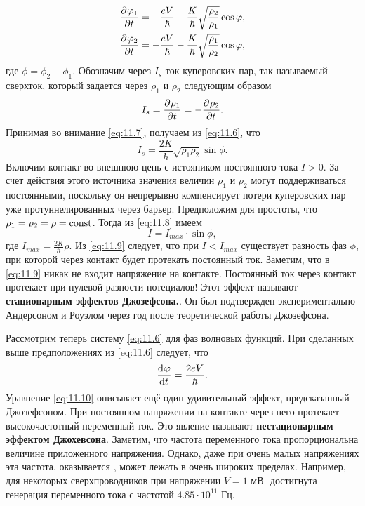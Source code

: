 \begin{align}
        \label{eq:11.6}
        \pdv[]{\varphi_{1}}{t} = -\frac{eV}{\hbar} - \frac{K}{\hbar}\sqrt{\frac{\rho_{2}}{\rho_{1}}}
        \cos \varphi, \\
        \pdv[]{\varphi_{2}}{t} = -\frac{eV}{\hbar} - \frac{K}{\hbar}\sqrt{\frac{\rho_{1}}{\rho_{2}}}
        \cos \varphi, \\
\end{align}
где $\phi = \phi_{2}-\phi_{1}$. Обозначим через $I_s$ ток куперовских пар, так называемый
сверхток, который задается через $\rho_{1}$ и $\rho_{2}$ следующим образом
\begin{equation}
        \label{eq:11.7}
        I_s = \pdv[]{\rho_{1}}{t}= - \pdv[]{\rho_{2}}{t}.
\end{equation}
Принимая во внимание \eqref{eq:11.7}, получаем из \eqref{eq:11.6}, что
\begin{equation}
        \label{eq:11.8}
        I_s = \frac{2K}{\hbar}\sqrt{\rho_{1}\rho_{2}} \sin \phi.
\end{equation}
Включим контакт во внешнюю цепь с истояником постоянного тока $I>0$. За счет действия этого источника
значения величин $\rho_{1}$ и $\rho_{2}$ могут поддерживаться постоянными, поскольку он непрерывно компенсирует потери куперовских пар уже протуннелированных через барьер. Предположим для простоты,
что $\rho_{1}= \rho_{2}=\rho= \textrm{const}$. Тогда из \eqref{eq:11.8} имеем
\begin{equation}
        \label{eq:11.9}
        I= I_{max}\cdot \sin\phi,
\end{equation}
где $I_{max} = \frac{2K}{\hbar}\rho$. Из \eqref{eq:11.9} следует, что при $I<I_{max}$ существует
разность фаз $\phi$, при которой через контакт будет протекать постоянный ток. 
Заметим, что в \eqref{eq:11.9} никак не входит напряжение на контакте. Постоянный ток через контакт протекает при нулевой разности потециалов!
Этот эффект называют \textbf{стационарным эффектов Джозефсона.}. Он был подтвержден экспериментально
Андерсоном и Роуэлом через год после теоретической работы Джозефсона.

Рассмотрим теперь систему \eqref{eq:11.6} для фаз волновых функций. При сделанных выше предположениях
из \eqref{eq:11.6} следует, что
\begin{equation}
        \label{eq:11.10}
        \dv[]{\varphi}{t}= \frac{2eV}{\hbar}.
\end{equation}
Уравнение \eqref{eq:11.10} описывает ещё один удивительный эффект, предсказанный Джозефсоном. 
При постоянном напряжении на контакте через него протекает высокочастотный переменный ток.
Это явление называют \textbf{нестационарным эффектом Джохевсона}. Заметим,
что частота переменного тока пропорциональна величине приложенного напряжения. Однако, даже при очень малых напряжениях эта частота, оказывается , может лежать в очень широких пределах. 
Например, для некоторых сверхпроводников при напряжении $V=1 \text{ мВ }$ достигнута генерация переменного тока с частотой $4.85\cdot 10^{11}$ Гц.

